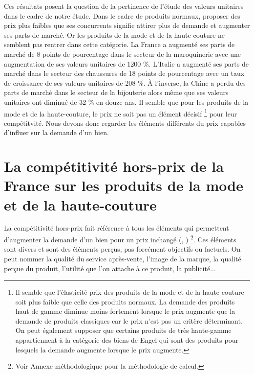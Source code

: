 \documentclass[french,10pt,a4paper]{article}
\begin{document}
\bigskip

Ces résultats posent la question de la pertinence de l'étude des valeurs unitaires dans le cadre de notre étude. Dans le cadre de produits \og normaux\fg{}, proposer des prix plus faibles que ses concurrents signifie attirer plus de demande et augmenter ses parts de marché. Or les produits de la mode et de la haute couture ne semblent pas rentrer dans cette catégorie. La France a augmenté ses parts de marché de 8 points de pourcentage dans le secteur de la maroquinerie avec une augmentation de ses valeurs unitaires de 1200 \%. L'Italie a augmenté ses parts de marché dans le secteur des chaussures de 18 points de pourcentage avec un taux de croissance de ses valeurs unitaires de 208 \%. À l'inverse, la Chine a perdu des parts de marché dans le secteur de la bijouterie alors même que ses valeurs unitaires ont diminué de 32 \% en douze ans. Il semble que pour les produits de la mode et de la haute-couture, le prix ne soit pas un élément décisif \footnote{Il semble que l'élasticité prix des produits de la mode et de la haute-couture soit plus faible que celle des produits \og normaux\fg{}. La demande des produits haut de gamme diminue moins fortement lorsque le prix augmente que la demande de produits classiques car le prix n'est pas un critère déterminant. On peut également supposer que certains produits de très haute-gamme appartiennent à la catégorie des biens de \og Engel\fg{} qui sont des produits pour lesquels la demande augmente lorsque le prix augmente.} pour leur compétitvité. Nous devons donc regarder les éléments différents du prix capables d'influer sur la demande d'un bien. 






\newpage
{}
\section{La compétitivité hors-prix de la France sur les produits de la mode et de la haute-couture}

La compétitivité hors-prix fait référence à tous les éléments qui permettent d'augmenter la demande d'un bien pour un prix inchangé (\cite{Khandelwal2013}, \cite{Bas2015}) \footnote{Voir Annexe méthodologique pour la méthodologie de calcul.}. Ces éléments sont divers et sont des éléments perçus, pas forcément objectifs ou factuels. On peut nommer la qualité du service après-vente, l'image de la marque, la qualité perçue du produit, l'utilité que l'on attache à ce produit, la publicité... 
\end{document}
